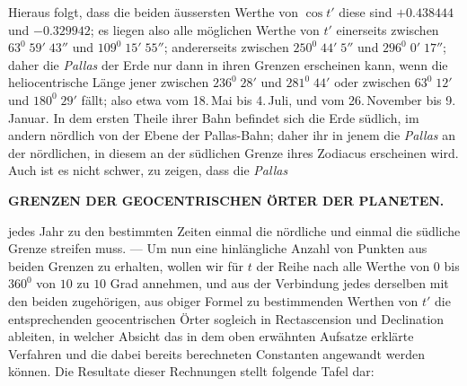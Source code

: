 Hieraus folgt, dass die beiden äussersten Werthe von $\cos t'$ diese sind
$+0.438444$ und $-0.329942$; es liegen also alle möglichen Werthe von $t'$ einerseits
zwischen $63^0\;59'\;43''$ und $109^0\;15'\;55''$; andererseits zwischen $250^0\;44'\;5''$
und $296^0\;0'\;17''$; daher die \textit{Pallas} der Erde nur dann in ihren Grenzen erscheinen
kann, wenn die heliocentrische Länge jener zwischen $236^0\;28'$ und $281^0\;44'$
oder zwischen $63^0\;12'$ und $180^0\;29'$ fällt; also etwa vom 18.\,Mai bis 4.\,Juli, und
vom 26.\,November bis 9.\,Januar. In dem ersten Theile ihrer Bahn befindet sich
die Erde südlich, im andern nördlich von der Ebene der Pallas-Bahn; daher ihr
in jenem die \textit{Pallas} an der nördlichen, in diesem an der südlichen Grenze ihres
Zodiacus erscheinen wird. Auch ist es nicht schwer, zu zeigen, dass die \textit{Pallas}
\clearpage
\thispagestyle{empty}
\noindent{}%
\makebox[12mm][l]{}%
\parbox[t]{\dimexpr\linewidth-24mm\relax}{\centering\fontsize{7.4}{9.2}\selectfont\bfseries GRENZEN DER GEOCENTRISCHEN ÖRTER DER PLANETEN.\par}%
\par\nobreak\medskip
\fontsize{10.4}{11.9}\selectfont
\noindent jedes Jahr zu den bestimmten Zeiten einmal die nördliche und einmal die südliche
Grenze streifen muss. — Um nun eine hinlängliche Anzahl von Punkten
aus beiden Grenzen zu erhalten, wollen wir für $t$ der Reihe nach alle Werthe
von $0$ bis $360^0$ von $10$ zu $10$ Grad annehmen, und aus der Verbindung jedes
derselben mit den beiden zugehörigen, aus obiger Formel zu bestimmenden Werthen
von $t'$ die entsprechenden geocentrischen Örter sogleich in Rectascension
und Declination ableiten, in welcher Absicht das in dem oben erwähnten Aufsatze
erklärte Verfahren und die dabei bereits berechneten Constanten angewandt
werden können. Die Resultate dieser Rechnungen stellt folgende Tafel dar:

